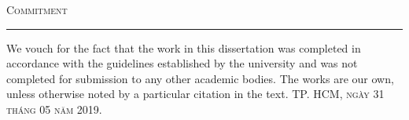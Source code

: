 \thispagestyle{empty}
\vspace*{3cm}
\noindent\Huge\textsc{Commitment}\\
\normalsize
\noindent\rule[2pt]{\textwidth}{0.8pt}
\hspace*{5cm}

We vouch for the fact that the work in this dissertation was completed in accordance with the guidelines established by the university and was not completed for submission to any other academic bodies. The works are our own, unless otherwise noted by a particular citation in the text.
	\hfill \textsc{TP. HCM, ngày 31 tháng 05 năm 2019.}
	
\cleardoublepage
